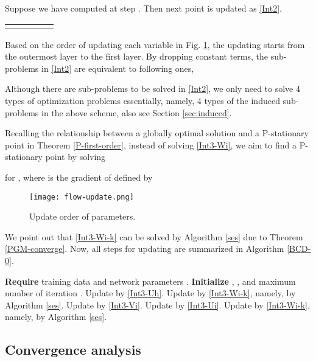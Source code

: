 \documentclass[journal]{IEEEtran}
\begin{document}
Suppose we have computed  at step . Then next point    is updated as \eqref{Int2}.

\begin{table*}[!htb]
\centering
\begin{tabular}{lcccr}
\parbox{1\textwidth}{ } \\\hline
\end{tabular}
\end{table*}
\indent Based on the order of updating each variable in Fig. \ref{scheldual}, the updating starts from the outermost layer to the first layer. By dropping constant terms, the sub-problems in \eqref{Int2} are equivalent to following ones,

Although there are  sub-problems to be solved in \eqref{Int2}, we only need to solve 4 types of optimization problems essentially, namely,  4 types of the induced sub-problems in the above scheme, also see Section \ref{sec:induced}.

Recalling the relationship between a globally optimal solution and a P-stationary point in Theorem \ref{P-first-order}, instead of solving  \eqref{Int3-Wi}, we aim to find a P-stationary point by solving

for , where   is the gradient of   defined by

\begin{figure}[!th]
\centering
\texttt{[image: flow-update.png]}
  \caption{{Update order of parameters.}}\label{scheldual}
\end{figure}
We point out that \eqref{Int3-Wi-k} can be solved by Algorithm \ref{ses} due to Theorem \ref{PGM-converge}. Now,   all steps for updating  are summarized in Algorithm \ref{BCD-0}.
 \begin{algorithm}[!th] \caption{BCD for 0/1 DNNs\label{BCD-0}}
	\begin{algorithmic}[1]
	\STATE \textbf{Require} training data  and network parameters .
	\STATE \textbf{Initialize} , , and maximum number of iteration .
	\FOR{}
	\STATE Update  by \eqref{Int3-Uh}.
	\STATE Update  by \eqref{Int3-Wi-k}, namely, by Algorithm \ref{ses}.
	 \FOR{ }
		\STATE Update  by \eqref{Int3-Vi}.
		\STATE Update  by \eqref{Int3-Ui}.
		\STATE Update  by \eqref{Int3-Wi-k}, namely, by Algorithm \ref{ses}.
		\ENDFOR
\ENDFOR
\RETURN 
	\end{algorithmic}
\end{algorithm}


\subsection{Convergence analysis}
\end{document}
